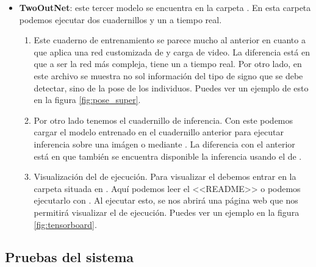 \begin{itemize}
  \item \textbf{TwoOutNet}: este tercer modelo se encuentra en la carpeta . En esta carpeta podemos ejecutar dos cuadernillos y un  a tiempo real.

        \begin{enumerate}
          \item Este cuaderno de entrenamiento se parece mucho al anterior en cuanto a que aplica una red customizada de  y carga  de video. La diferencia está en que a ser la red más compleja, tiene un  a tiempo real. Por otro lado, en este archivo se muestra no sol información del tipo de signo que se debe detectar, sino de la pose de los individuos. Puedes ver un ejemplo de esto en la figura \ref{fig:pose_super}.

          \item Por otro lado tenemos el cuadernillo de inferencia. Con este podemos cargar el modelo entrenado en el cuadernillo anterior para ejecutar inferencia sobre una imágen o mediante . La diferencia con el anterior está en que también se encuentra disponible la inferencia usando el  de .

          \item Visualización del  de ejecución. Para visualizar el  debemos entrar en la carpeta situada en . Aquí podemos leer el  <<README>> o podemos ejecutarlo con . Al ejecutar esto, se nos abrirá una página web que nos permitirá visualizar el  de ejecución. Puedes ver un ejemplo en la figura \ref{fig:tensorboard}.
        \end{enumerate}

\end{itemize}



\subsection{Pruebas del sistema}

